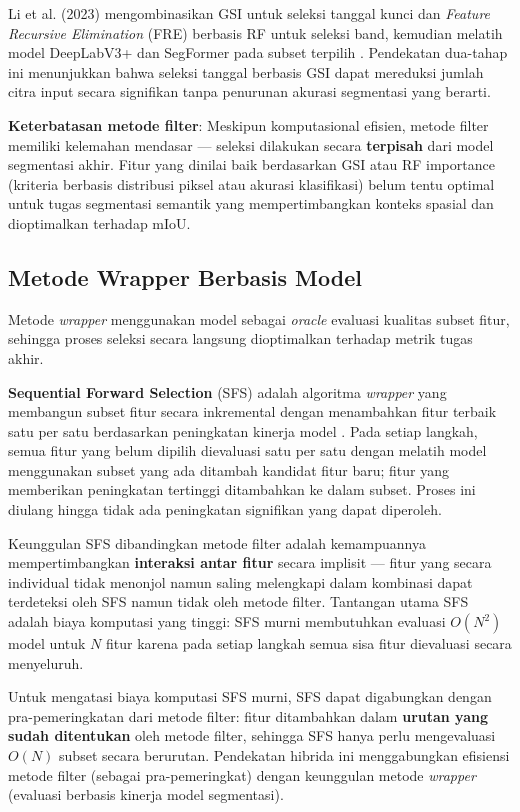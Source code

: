 Li et al. (2023) mengombinasikan GSI untuk seleksi tanggal kunci dan \textit{Feature Recursive Elimination} (FRE) berbasis RF untuk seleksi band, kemudian melatih model DeepLabV3+ dan SegFormer pada subset terpilih \citep{li2023hetao}.
Pendekatan dua-tahap ini menunjukkan bahwa seleksi tanggal berbasis GSI dapat mereduksi jumlah citra input secara signifikan tanpa penurunan akurasi segmentasi yang berarti.

\textbf{Keterbatasan metode filter}: Meskipun komputasional efisien, metode filter memiliki kelemahan mendasar — seleksi dilakukan secara \textbf{terpisah} dari model segmentasi akhir.
Fitur yang dinilai baik berdasarkan GSI atau RF importance (kriteria berbasis distribusi piksel atau akurasi klasifikasi) belum tentu optimal untuk tugas segmentasi semantik yang mempertimbangkan konteks spasial dan dioptimalkan terhadap mIoU.

\subsection{Metode Wrapper Berbasis Model}
Metode \textit{wrapper} menggunakan model sebagai \textit{oracle} evaluasi kualitas subset fitur, sehingga proses seleksi secara langsung dioptimalkan terhadap metrik tugas akhir.

\textbf{Sequential Forward Selection} (SFS) adalah algoritma \textit{wrapper} yang membangun subset fitur secara inkremental dengan menambahkan fitur terbaik satu per satu berdasarkan peningkatan kinerja model \citep{rs15215203}.
Pada setiap langkah, semua fitur yang belum dipilih dievaluasi satu per satu dengan melatih model menggunakan subset yang ada ditambah kandidat fitur baru; fitur yang memberikan peningkatan tertinggi ditambahkan ke dalam subset.
Proses ini diulang hingga tidak ada peningkatan signifikan yang dapat diperoleh.

Keunggulan SFS dibandingkan metode filter adalah kemampuannya mempertimbangkan \textbf{interaksi antar fitur} secara implisit — fitur yang secara individual tidak menonjol namun saling melengkapi dalam kombinasi dapat terdeteksi oleh SFS namun tidak oleh metode filter.
Tantangan utama SFS adalah biaya komputasi yang tinggi: SFS murni membutuhkan evaluasi $O(N^2)$ model untuk $N$ fitur karena pada setiap langkah semua sisa fitur dievaluasi secara menyeluruh.

Untuk mengatasi biaya komputasi SFS murni, SFS dapat digabungkan dengan pra-pemeringkatan dari metode filter: fitur ditambahkan dalam \textbf{urutan yang sudah ditentukan} oleh metode filter, sehingga SFS hanya perlu mengevaluasi $O(N)$ subset secara berurutan.
Pendekatan hibrida ini menggabungkan efisiensi metode filter (sebagai pra-pemeringkat) dengan keunggulan metode \textit{wrapper} (evaluasi berbasis kinerja model segmentasi).

